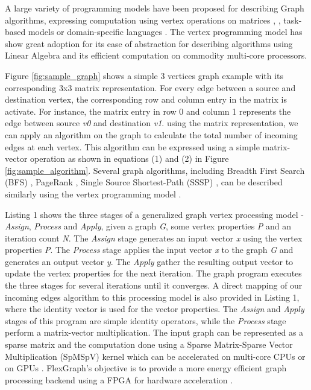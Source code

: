A large variety of programming models have been proposed for describing Graph algorithms, expressing computation using vertex operations on matrices \cite{GraphMat} \cite{GraphLab}, \cite{Pregel}, \cite{MapGraph} \cite{GraphX} task-based models \cite{Galois} or domain-specific languages \cite{GreenMarl}. The vertex programming model has show great adoption for its ease of abstraction for describing algorithms using Linear Algebra and its efficient computation on commodity multi-core processors.

Figure \ref{fig:sample_graph} shows a simple 3 vertices graph example with its corresponding 3x3 matrix representation. For every edge between a source and destination vertex, the corresponding row and column entry in the matrix is activate. For instance, the matrix entry in row 0 and column 1 represents the edge between source \textit{v0} and destination \textit{v1}. using the matrix representation, we can apply an algorithm on the graph to calculate the total number of incoming edges at each vertex. This algorithm can be expressed using a simple matrix-vector operation as shown in equations (1) and (2) in Figure \ref{fig:sample_algorithm}. Several graph algorithms, including Breadth First Search (BFS) \cite{BFS}, PageRank \cite{PageRank}, Single Source Shortest-Path (SSSP) \cite{SSSP}, can be described similarly using the vertex programming model \cite{GraphMat}.

Listing 1 shows the three stages of a generalized graph vertex processing model - \textit{Assign}, \textit{Process} and \textit{Apply}, given a graph \textit{G}, some vertex properties \textit{P} and an iteration count \textit{N}. The \textit{Assign} stage generates an input vector \textit{x} using the vertex properties \textit{P}. The \textit{Process} stage applies the input vector \textit{x} to the graph \textit{G} and generates an output vector \textit{y}. The\textit{ Apply} gather the resulting output vector to update the vertex properties for the next iteration. The graph program executes the three stages for several iterations until it converges. A direct mapping of our incoming edges algorithm to this processing model is also provided in Listing 1, where the identity vector is used for the vector properties. The \textit{Assign} and \textit{Apply} stages of this program are simple identity operators, while the \textit{Process} stage perform a matrix-vector multiplication. The input graph can be represented as a sparse matrix and the computation done using a Sparse Matrix-Sparse Vector Multiplication (SpMSpV) kernel which can be accelerated on multi-core CPUs \cite{GraphMat} or on GPUs \cite{MapGraph}. FlexGraph's objective is to provide a more energy efficient graph processing backend using a FPGA for hardware acceleration \cite{Catapult}.

